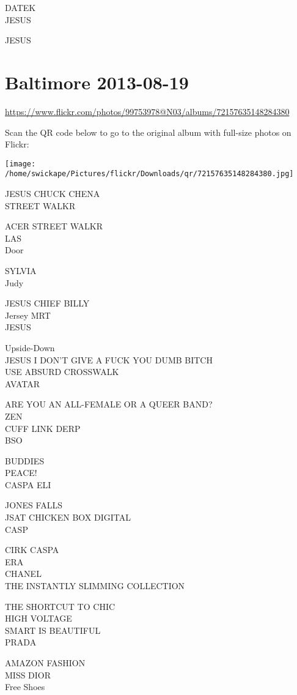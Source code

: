 \documentclass[10pt,letterpaper]{article}
\begin{document}
DATEK\\
JESUS

JESUS


\section*{Baltimore 2013-08-19}

\url{https://www.flickr.com/photos/99753978@N03/albums/72157635148284380}

Scan the QR code below to go to the original album with full-size photos on Flickr:

\texttt{[image: /home/swickape/Pictures/flickr/Downloads/qr/72157635148284380.jpg]}


JESUS CHUCK CHENA\\
STREET WALKR

ACER STREET WALKR\\
LAS\\
Door

SYLVIA\\
Judy

JESUS CHIEF BILLY\\
Jersey MRT\\
JESUS

Upside{-}Down\\
JESUS I DON'T GIVE A FUCK YOU DUMB BITCH\\
USE ABSURD CROSSWALK\\
AVATAR

ARE YOU AN ALL{-}FEMALE OR A QUEER BAND?\\
ZEN\\
CUFF LINK DERP\\
BSO

BUDDIES\\
PEACE!\\
CASPA ELI

JONES FALLS\\
JSAT CHICKEN BOX DIGITAL\\
CASP

CIRK CASPA\\
ERA\\
CHANEL\\
THE INSTANTLY SLIMMING COLLECTION

THE SHORTCUT TO CHIC\\
HIGH VOLTAGE\\
SMART IS BEAUTIFUL\\
PRADA

AMAZON FASHION\\
MISS DIOR\\
Free Shoes
\end{document}
